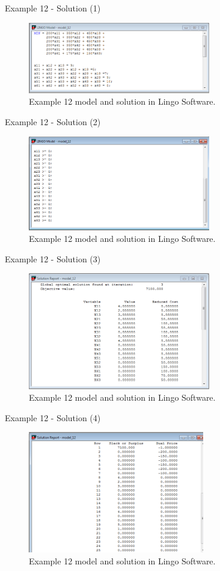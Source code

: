 \begin{frame}{Example 12 - Solution (1)}
\begin{figure}
    \includegraphics[width=300px]{slides/ex12/screenshot_a.png}
    \caption{Example 12 model and solution in Lingo Software.}
\end{figure}
\end{frame}

\begin{frame}{Example 12 - Solution (2)}
\begin{figure}
    \includegraphics[width=300px]{slides/ex12/screenshot_b.png}
    \caption{Example 12 model and solution in Lingo Software.}
\end{figure}
\end{frame}

\begin{frame}{Example 12 - Solution (3)}
\begin{figure}
    \includegraphics[width=300px]{slides/ex12/screenshot_c.png}
    \caption{Example 12 model and solution in Lingo Software.}
\end{figure}
\end{frame}

\begin{frame}{Example 12 - Solution (4)}
\begin{figure}
    \includegraphics[width=290px]{slides/ex12/screenshot_d.png}
    \caption{Example 12 model and solution in Lingo Software.}
\end{figure}
\end{frame}

